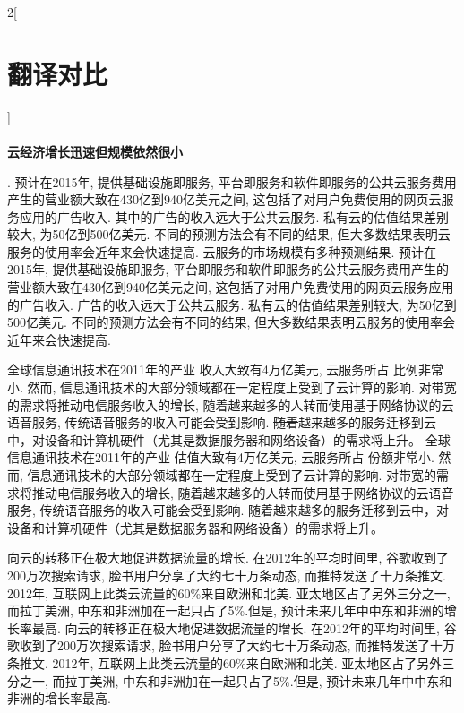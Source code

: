 \documentclass[a4paper, UTF8, 12pt]{article}
\begin{document}
\begin{paracol}{2}[\section{翻译对比}]
    
    \switchcolumn*
    \paragraph{} 
    \switchcolumn
    {\bfseries 云经济增长迅速但规模依然很小}

    . 预计在2015年, 提供基础设施即服务, 平台即服务和软件即服务的公共云服务费用产生的营业额大致在430亿到940亿美元之间, 这包括了对用户免费使用的网页云服务应用的广告收入. {\color{red} 其中的广告}的收入远大于公共云服务. 私有云的估值结果差别较大, 为50亿到500亿美元. {\color{blue} 不同的预测方法会有不同的结果}, 但大多数结果表明云服务的使用率会近年来会快速提高.
    \switchcolumn
    {\color{red} 云服务的市场规模有多种预测结果}. 预计在2015年, 提供基础设施即服务, 平台即服务和软件即服务的公共云服务费用产生的营业额大致在430亿到940亿美元之间, 这包括了对用户免费使用的网页云服务应用的广告收入. {\color{red} 广告}的收入远大于公共云服务. 私有云的估值结果差别较大, 为50亿到500亿美元.  {\color{blue} 不同的预测方法会有不同的结果}, 但大多数结果表明云服务的使用率会近年来会快速提高.
    
    \switchcolumn*
    全球信息通讯技术在2011年的产业{\color{red} 收入}大致有4万亿美元, 云服务所占{\color{red} 比例}非常小. 然而, 信息通讯技术的大部分领域都在一定程度上受到了云计算的影响. 对带宽的需求将推动电信服务收入的增长, 随着越来越多的人转而使用基于网络协议的云语音服务, 传统语音服务的收入可能会受到影响. {\color{red} \sout{随着}}越来越多的服务迁移到云中，对设备和计算机硬件（尤其是数据服务器和网络设备）的需求将上升。
    \switchcolumn
    全球信息通讯技术在2011年的产业{\color{red} 估值}大致有4万亿美元, 云服务所占{\color{red} 份额}非常小. 然而, 信息通讯技术的大部分领域都在一定程度上受到了云计算的影响. 对带宽的需求将推动电信服务收入的增长, 随着越来越多的人转而使用基于网络协议的云语音服务, 传统语音服务的收入可能会受到影响. {\color{red} 随着}越来越多的服务迁移到云中，对设备和计算机硬件（尤其是数据服务器和网络设备）的需求将上升。

    \switchcolumn*
    向云的转移正在极大地促进数据流量的增长. 在2012年的平均时间里, 谷歌收到了200万次搜索请求, 脸书用户分享了大约七十万条动态, 而推特发送了十万条推文. 2012年, 互联网上此类云流量的60\%来自欧洲和北美. 亚太地区占了另外三分之一, 而拉丁美洲, 中东和非洲加在一起只占了5\%.但是, 预计未来几年中中东和非洲的增长率最高.
    \switchcolumn
    向云的转移正在极大地促进数据流量的增长. 在2012年的平均时间里, 谷歌收到了200万次搜索请求, 脸书用户分享了大约七十万条动态, 而推特发送了十万条推文. 2012年, 互联网上此类云流量的60\%来自欧洲和北美. 亚太地区占了另外三分之一, 而拉丁美洲, 中东和非洲加在一起只占了5\%.但是, 预计未来几年中中东和非洲的增长率最高.


\end{paracol}
\end{document}
